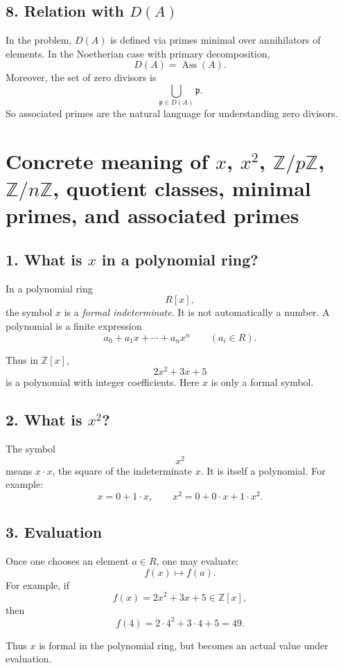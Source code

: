 \documentclass[12pt,a4paper,oneside]{report}
\DeclareMathOperator{\Ass}{Ass}
\theoremstyle{notespace}
\begin{document}
\subsection{8. Relation with \(D(A)\)}

In the problem, \(D(A)\) is defined via primes minimal over annihilators of elements. In the Noetherian case with primary decomposition,
\[
D(A)=\Ass(A).
\]
Moreover, the set of zero divisors is
\[
\bigcup_{\mathfrak p\in D(A)}\mathfrak p.
\]
So associated primes are the natural language for understanding zero divisors.	
	
	
	\section{Concrete meaning of \(x\), \(x^2\), \(\mathbb Z/p\mathbb Z\), \(\mathbb Z/n\mathbb Z\), quotient classes, minimal primes, and associated primes}
	
	\subsection{1. What is \(x\) in a polynomial ring?}
	
	In a polynomial ring
	\[
	R[x],
	\]
	the symbol \(x\) is a \emph{formal indeterminate}. It is not automatically a number.
	A polynomial is a finite expression
	\[
	a_0+a_1x+\cdots+a_nx^n
	\qquad (a_i\in R).
	\]
	
	Thus in \(\mathbb Z[x]\),
	\[
	2x^2+3x+5
	\]
	is a polynomial with integer coefficients. Here \(x\) is only a formal symbol.
	
	\subsection{2. What is \(x^2\)?}
	
	The symbol
	\[
	x^2
	\]
	means \(x\cdot x\), the square of the indeterminate \(x\). It is itself a polynomial.
	For example:
	\[
	x=0+1\cdot x,\qquad x^2=0+0\cdot x+1\cdot x^2.
	\]
	
	\subsection{3. Evaluation}
	
	Once one chooses an element \(a\in R\), one may evaluate:
	\[
	f(x)\mapsto f(a).
	\]
	For example, if
	\[
	f(x)=2x^2+3x+5\in \mathbb Z[x],
	\]
	then
	\[
	f(4)=2\cdot 4^2+3\cdot 4+5=49.
	\]
	
	Thus \(x\) is formal in the polynomial ring, but becomes an actual value under evaluation.
	
\end{document}
